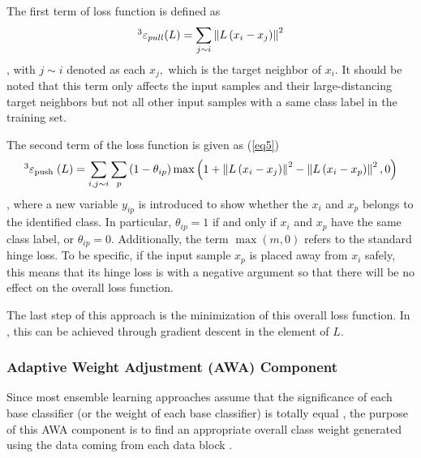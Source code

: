 The first term of loss function is defined as
\begin{equation}\label{eq4}\footnotemark[3]
    \varepsilon_{pull}(L)=\sum\limits_{j \sim i}\left\|L\left(x_{i}-x_{j}\right)\right\|^{2}
\end{equation}
, with $j \sim i$ denoted as each $x_{j},$ which is the target neighbor of $x_{i}$. It should be noted that this term only affects the input samples and their large-distancing target neighbors but not all other input samples with a same class label in the training set.

The second term of the loss function is given as (\ref{eq5})
\begin{equation}\label{eq5}\footnotemark[3]
    \varepsilon_{\text {push }}(L)=\sum\limits_{i, j \sim i} \sum\limits_{p}\left(1-\theta_{i p}\right) \max \left(1+\left\|L\left(x_{i}-x_{j}\right)\right\|^{2}-\left\| L\left(x_{i}-x_{p}\right)\right\|^{2}, 0\right)
\end{equation}
, where a new variable $y_{i p}$ is introduced to show whether the $x_{i}$ and $x_{p}$ belongs to the identified class. In particular, $\theta_{i p}=1$ if and only if $x_{i}$ and $x_{p}$ have the same class label, or $\theta_{i p}=0$. Additionally, the term $\max (m, 0)$ refers to the standard hinge loss. To be specific, if the input sample $x_{p}$ is placed away from $x_{i}$ safely, this means that its hinge loss is with a negative argument so that there will be no effect on the overall loss function. 

The last step of this approach is the minimization of this overall loss function. In \cite{69}, this can be achieved through gradient descent in the element of $L$.

\subsubsection{Adaptive Weight Adjustment (AWA) Component}
Since most ensemble learning approaches assume that the significance of each base classifier (or the weight of each base classifier) is totally equal \cite{32}, the purpose of this AWA component is to find an appropriate overall class weight generated using the data coming from each data block \cite{73}.

